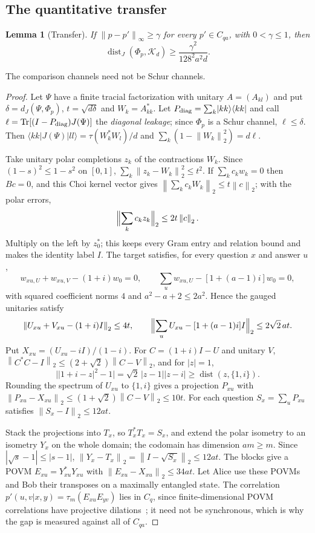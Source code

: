 \documentclass[11pt]{article}
\newtheorem{lemma}{Lemma}[section]
\theoremstyle{definition}
\theoremstyle{remark}
\DeclareMathOperator{\Tr}{Tr}
\DeclareMathOperator{\dist}{dist}
\newcommand{\K}{\mathcal K}
\newcommand{\norm}[1]{\left\lVert#1\right\rVert}
\newcommand{\ket}[1]{\lvert#1\rangle}
\newcommand{\bra}[1]{\langle#1\rvert}
\begin{document}
\subsection{The quantitative transfer}

\begin{lemma}[Transfer]\label{lem:transfer}
If $\norm{p-p'}_\infty\ge\gamma$ for every $p'\in C_{qa}$, with $0<\gamma\le1$, then
\[
 \dist_J(\Phi_p,\K_d)\ge\frac{\gamma^2}{128^2a^2d}.
\]
\end{lemma}

The comparison channels need not be Schur channels.

\begin{proof}
Let $\Psi$ have a finite tracial factorization with unitary $A=(A_{kl})$ and put $\delta=d_J(\Psi,\Phi_p)$, $t=\sqrt{d\delta}$ and $W_k=A_{kk}^*$. Let $P_{\rm diag}=\sum_k\ket{kk}\bra{kk}$ and call $\ell=\Tr[(I-P_{\rm diag})J(\Psi)]$ the \emph{diagonal leakage}; since $\Phi_p$ is a Schur channel, $\ell\le\delta$. Then $\bra{kk}J(\Psi)\ket{ll}=\tau(W_k^*W_l)/d$ and $\sum_k(1-\norm{W_k}_2^2)=d\ell$.

Take unitary polar completions $z_k$ of the contractions $W_k$. Since $(1-s)^2\le1-s^2$ on $[0,1]$, $\sum_k\norm{z_k-W_k}_2^2\le t^2$. If $\sum_kc_kw_k=0$ then $Bc=0$, and this Choi kernel vector gives $\norm{\sum_kc_kW_k}_2\le t\norm c_2$; with the polar errors,
\[
 \Bigl\|\sum_kc_kz_k\Bigr\|_2\le2t\norm c_2.
\]
Multiply on the left by $z_0^*$; this keeps every Gram entry and relation bound and makes the identity label $I$. The target satisfies, for every question $x$ and answer $u$,
\[
 w_{xu,U}+w_{xu,V}-(1+i)w_0=0,\qquad \sum_uw_{xu,U}-[1+(a-1)i]w_0=0,
\]
with squared coefficient norms $4$ and $a^2-a+2\le2a^2$. Hence the gauged unitaries satisfy
\[
 \norm{U_{xu}+V_{xu}-(1+i)I}_2\le4t,\qquad
 \Bigl\|\sum_uU_{xu}-[1+(a-1)i]I\Bigr\|_2\le2\sqrt2\,at.
\]
Put $X_{xu}=(U_{xu}-iI)/(1-i)$. For $C=(1+i)I-U$ and unitary $V$, $\norm{C^*C-I}_2\le(2+\sqrt2)\norm{C-V}_2$, and for $|z|=1$,
\[
 \bigl||1+i-z|^2-1\bigr|=\sqrt2\,|z-1||z-i|\ge\dist(z,\{1,i\}).
\]
Rounding the spectrum of $U_{xu}$ to $\{1,i\}$ gives a projection $P_{xu}$ with $\norm{P_{xu}-X_{xu}}_2\le(1+\sqrt2)\norm{C-V}_2\le10t$. For each question $S_x=\sum_uP_{xu}$ satisfies $\norm{S_x-I}_2\le12at$.

Stack the projections into $T_x$, so $T_x^*T_x=S_x$, and extend the polar isometry to an isometry $Y_x$ on the whole domain; the codomain has dimension $am\ge m$. Since $|\sqrt s-1|\le|s-1|$, $\norm{Y_x-T_x}_2=\norm{I-\sqrt{S_x}}_2\le12at$. The blocks give a POVM $E_{xu}=Y_{xu}^*Y_{xu}$ with $\norm{E_{xu}-X_{xu}}_2\le34at$. Let Alice use these POVMs and Bob their transposes on a maximally entangled state. The correlation $p'(u,v|x,y)=\tau_m(E_{xu}E_{yv})$ lies in $C_q$, since finite-dimensional POVM correlations have projective dilations~\cite[proof of Theorem~5.3]{PSSTW}; it need not be synchronous, which is why the gap is measured against all of $C_{qa}$.


\end{proof}
\end{document}
